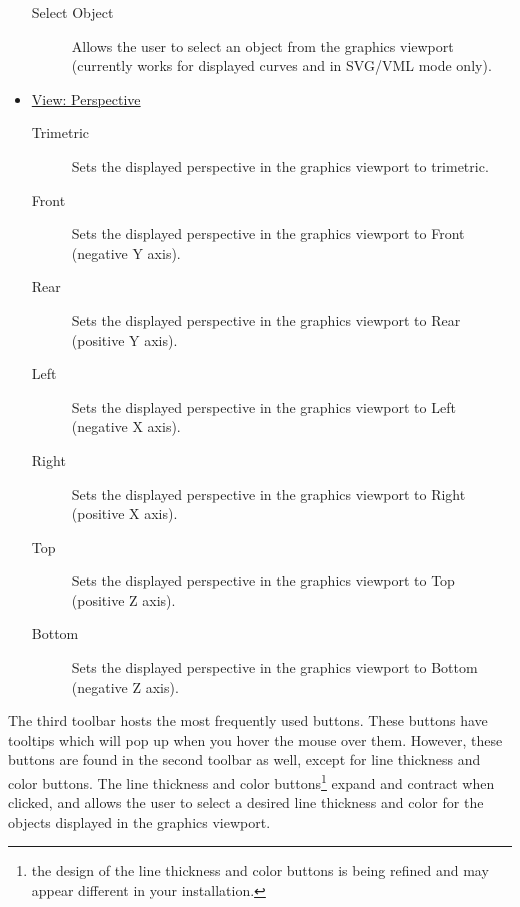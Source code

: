\documentclass [11pt]{book}
\begin{document}
\begin{itemize}
\begin{description}
\item [Select Object]
Allows the user to select an object from the graphics
                  viewport (currently works for displayed curves and
                  in SVG/VML mode only).

\end{description}



\item 
\underline{View: Perspective}

\begin{description}

\item [Trimetric]
Sets the displayed perspective in the graphics viewport to trimetric.

\item [Front]
Sets the displayed perspective in the graphics viewport to Front (negative Y axis).

\item [Rear]
Sets the displayed perspective in the graphics viewport to Rear (positive Y axis).

\item [Left]
Sets the displayed perspective in the graphics viewport to Left (negative X axis).

\item [Right]
Sets the displayed perspective in the graphics viewport to Right (positive X axis).

\item [Top]
Sets the displayed perspective in the graphics viewport to Top (positive Z axis).

\item [Bottom]
Sets the displayed perspective in the graphics viewport to Bottom (negative Z axis).

\end{description}



\end{itemize}



The third toolbar hosts the most frequently used
buttons. These buttons have tooltips which will pop up when you hover
the mouse over them. However, these buttons are found in the second
toolbar as well, except for line thickness and color buttons. The line
thickness and color buttons\footnote{the design of the line thickness and color buttons is
being refined and may appear different in your installation.} expand and contract when clicked, and allows the user to
select a desired line thickness and color for the objects displayed in
the graphics viewport.
\end{document}
